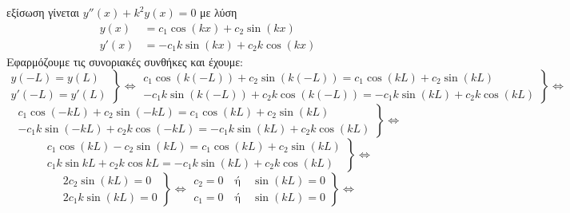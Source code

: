 \begin{solution}
\begin{myitemize}
      εξίσωση γίνεται $ y''(x) +k^{2}y(x)=0$ με λύση 
      \begin{align*} 
        y(x) &= c_{1} \cos{(kx)} + c_{2} \sin{(kx)} \\
        y'(x) &= -c_{1}k \sin{(kx)} + c_{2}k \cos{(kx)} 
      \end{align*}
      Εφαρμόζουμε τις συνοριακές συνθήκες και έχουμε:
      \[
        \left.
          \begin{matrix}
            y(-L)=y(L) \\
            y'(-L)=y'(L)
          \end{matrix} 
        \right\} \Leftrightarrow 
        \left.
          \begin{matrix}
            c_{1} \cos{(k(-L))} + c_{2} \sin{(k(-L))} = c_{1} \cos{(kL)} + 
            c_{2} \sin{(kL)} \\
            - c_{1} k \sin{(k(-L))} + c_{2} k \cos{(k(-L))} = - c_{1}k \sin{(kL)} + 
            c_{2} k\cos{(kL)}
          \end{matrix} 
        \right\} \Leftrightarrow 
      \]
      \[
        \left.
          \begin{matrix}
            c_{1} \cos{(-kL)} + c_{2} \sin{(-kL)} = c_{1} \cos{(kL)} + c_{2} 
            \sin{(kL)} \\
            - c_{1} k \sin{(-kL)} + c_{2} k \cos{(-kL)} = - c_{1}k \sin{(kL)} + 
            c_{2} k\cos{(kL)}
          \end{matrix} 
        \right\} \Leftrightarrow 
      \]
      \[
        \left.
          \begin{matrix}
            c_{1} \cos{(kL)} - c_{2} \sin{(kL)} = c_{1} \cos{(kL)} + c_{2} \sin{(kL)} \\
            c_{1} k \sin{kL} + c_{2} k \cos{kL} = - c_{1}k \sin{(kL)} + c_{2} k\cos{(kL)}
          \end{matrix}
        \right\} \Leftrightarrow 
      \]
      \[
        \left.
          \begin{matrix}
            2 c_{2} \sin{(kL)} = 0 \\
            2 c_{1} k \sin{(kL)} = 0
          \end{matrix} 
        \right\} \Leftrightarrow 
        \left.
          \begin{matrix}
            c_{2} = 0 \quad \text{ή} \quad \sin{(kL)} = 0 \\
            c_{1} = 0 \quad \text{ή} \quad \sin{(kL)} = 0
          \end{matrix} 
        \right\} \Leftrightarrow 
\]
\end{myitemize}
\end{solution}
